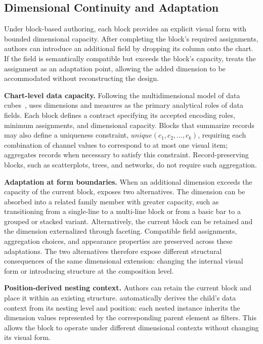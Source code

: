 \subsection{Dimensional Continuity and Adaptation}
\label{sec:compatibility}

Under block-based authoring, each block provides an explicit visual form with
bounded dimensional capacity. After completing the block's required
assignments, authors can introduce an additional field by dropping its column
onto the chart. If the field is semantically compatible but exceeds the
block's capacity, {\system} treats the assignment as an adaptation point,
allowing the added dimension to be accommodated without reconstructing the
design.



\textbf{Chart-level data capacity.}
Following the multidimensional model of data cubes~\cite{datacube}, {\system}
uses dimensions and measures as the primary analytical roles of data fields.
Each block defines a contract specifying its accepted encoding roles, minimum
assignments, and dimensional capacity. Blocks that summarize records may also
define a uniqueness constraint,
$\mathit{unique}(c_1,c_2,\ldots,c_k)$, requiring each combination of channel
values to correspond to at most one visual item; {\system} aggregates records
when necessary to satisfy this constraint. Record-preserving blocks, such as
scatterplots, trees, and networks, do not require such aggregation.

\textbf{Adaptation at form boundaries.}
When an additional dimension exceeds the capacity of the current block,
{\system} exposes two alternatives. The dimension can be absorbed into a
related family member with greater capacity, such as transitioning from a
single-line to a multi-line block or from a basic bar to a grouped or stacked
variant. Alternatively, the current block can be retained and the dimension
externalized through faceting. Compatible field assignments, aggregation
choices, and appearance properties are preserved across these adaptations.
The two alternatives therefore expose different structural consequences of
the same dimensional extension: changing the internal visual form or
introducing structure at the composition level.

\textbf{Position-derived nesting context.}
Authors can retain the current block and place it within an existing structure.
{\system} automatically derives the child's data context from its nesting
level and position: each nested instance inherits the dimension values
represented by the corresponding parent element as filters. This allows the
block to operate under different dimensional contexts without changing its
visual form.

